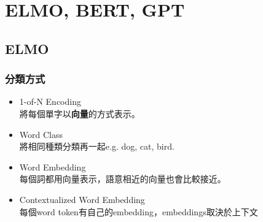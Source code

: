\chapter{ELMO, BERT, GPT}

\section{ELMO}

\subsection{分類方式}
\begin{itemize}
    \item 1-of-N Encoding\\
        將每個單字以\textbf{向量}的方式表示。
    \item Word Class \\
        將相同種類分類再一起e.g. dog, cat, bird.
    \item Word Embedding \\
        每個詞都用向量表示，語意相近的向量也會比較接近。
    \item Contextualized Word Embedding\\
        每個word token有自己的embedding，embeddings取決於上下文\\
\end{itemize} 


